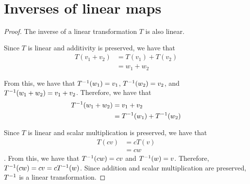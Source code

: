 \section{Inverses of linear maps}
\begin{proof} The inverse of a linear transformation $T$ is also linear.\gap

    Since $T$ is linear and additivity is preserved, we have that
    \begin{align*}
        T(v_1 + v_2) 
        &= T(v_1) + T(v_2) \\
        &= w_1 + w_2
    \end{align*}

    From this, we have that
    $T^{-1}(w_1) = v_1$,
    $T^{-1}(w_2) = v_2$, and
    $T^{-1}(w_1 + w_2) = v_1 + v_2$.
    Therefore, we have that
    \begin{align*}
        T^{-1}(w_1 + w_2) 
        &= v_1 + v_2 \\
        &= T^{-1}(w_1) + T^{-1}(w_2)
    \end{align*}

    Since $T$ is linear and scalar multiplication is preserved, 
    we have that 
    \begin{align*}
        T(cv) 
        &= cT(v) \\
        &= cw
    \end{align*}. 
    From this, we have that $T^{-1}(cw) = cv$ and $T^{-1}(w) = v$.
    Therefore, 
    $T^{-1}(cw) = cv = cT^{-1}(w)$.
    Since addition and scalar multiplication are preserved,
    $T^{-1}$ is a linear transformation.
\end{proof}